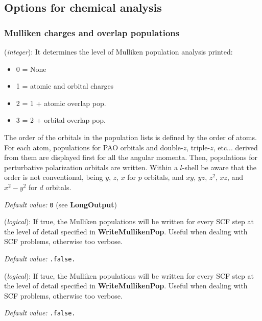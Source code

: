 \documentclass[11pt]{article}
\begin{document}
\subsection{Options for chemical analysis}

\subsubsection{Mulliken charges and overlap populations}
\begin{description}
\itemsep 10pt
\parsep 0pt

\item[{\bf WriteMullikenPop}] ({\it integer}):
It determines the level of Mulliken population analysis printed:
\begin{itemize}
\item 0 = None
\item 1 = atomic and orbital charges
\item 2 = 1 + atomic overlap pop.
\item 3 = 2 + orbital overlap pop.
\end{itemize}
The order of the orbitals in the population lists is defined
by the order of atoms. For each atom, populations for PAO orbitals and
double-$z$, triple-$z$, etc... derived from them are displayed first for
all the angular momenta. Then, populations for perturbative polarization
orbitals are written.
Within a $l$-shell be aware that the order is not
conventional, being $y$, $z$, $x$ for $p$ orbitals, and
$xy$, $yz$, $z^2$, $xz$, and $x^2-y^2$ for $d$ orbitals.

{\it Default value:} {\tt 0} (see {\bf LongOutput})


\item[{\bf MullikenInSCF}] ({\it logical}):
If true, the Mulliken populations will be written for every SCF step
at the level of detail specified in {\bf WriteMullikenPop}. Useful
when dealing with SCF problems, otherwise too verbose.

{\it Default value:} {\tt .false.}

\item[{\bf MullikenInSCF}] ({\it logical}):
If true, the Mulliken populations will be written for every SCF step
at the level of detail specified in {\bf WriteMullikenPop}. Useful
when dealing with SCF problems, otherwise too verbose.

{\it Default value:} {\tt .false.}

\end{description}
\end{document}
